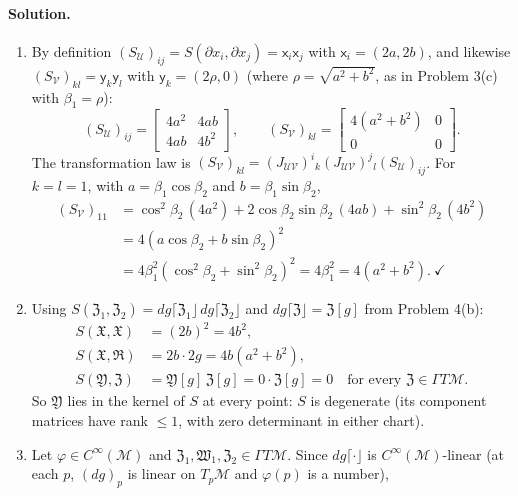 \documentclass[11pt]{article}
\newcommand{\Cinf}{C^\infty(\mathcal M)}
\begin{document}
\paragraph{Solution.}
\begin{enumerate}[label=(\alph*)]
\item By definition $(S_{\mathcal U})_{ij}=S(\partial x_i,\partial x_j)=\mathsf x_i\mathsf x_j$ with $\mathsf x_i=(2a,2b)$, and likewise $(S_{\mathcal V})_{kl}=\mathsf y_k\mathsf y_l$ with $\mathsf y_k=(2\rho,0)$
(where $\rho=\sqrt{a^2+b^2}$, as in Problem 3(c) with $\beta_1=\rho$):
\[
(S_{\mathcal U})_{ij}=\begin{bmatrix}4a^2&4ab\\4ab&4b^2\end{bmatrix},\qquad
(S_{\mathcal V})_{kl}=\begin{bmatrix}4(a^2+b^2)&0\\0&0\end{bmatrix}.
\]
The transformation law is $(S_{\mathcal V})_{kl}=(J_{\mathcal{UV}})^i{}_k(J_{\mathcal{UV}})^j{}_l(S_{\mathcal U})_{ij}$. For $k=l=1$, with $a=\beta_1\cos\beta_2$ and $b=\beta_1\sin\beta_2$,
\begin{align*}
(S_{\mathcal V})_{11}&=\cos^2\beta_2\,(4a^2)+2\cos\beta_2\sin\beta_2\,(4ab)+\sin^2\beta_2\,(4b^2)\\
&=4(a\cos\beta_2+b\sin\beta_2)^2\\
&=4\beta_1^2(\cos^2\beta_2+\sin^2\beta_2)^2=4\beta_1^2=4(a^2+b^2).\ \checkmark
\end{align*}
\item Using $S(\mathfrak Z_1,\mathfrak Z_2)=dg\lceil\mathfrak Z_1\rfloor\,dg\lceil\mathfrak Z_2\rfloor$ and $dg\lceil\mathfrak Z\rfloor=\mathfrak Z[g]$ from Problem 4(b):
\begin{align*}
S(\mathfrak X,\mathfrak X)&=(2b)^2=4b^2,\\
S(\mathfrak X,\mathfrak R)&=2b\cdot2g=4b(a^2+b^2),\\
S(\mathfrak Y,\mathfrak Z)&=\mathfrak Y[g]\,\mathfrak Z[g]=0\cdot\mathfrak Z[g]=0\quad\text{for every }\mathfrak Z\in\Gamma T\mathcal M.
\end{align*}
So $\mathfrak Y$ lies in the kernel of $S$ at every point: $S$ is degenerate (its component matrices have rank $\le1$, with zero determinant in either chart).
\item Let $\varphi\in\Cinf$ and $\mathfrak Z_1,\mathfrak W_1,\mathfrak Z_2\in\Gamma T\mathcal M$. Since $dg\lceil\cdot\rfloor$ is $C^\infty(\mathcal M)$-linear (at each $p$, $(dg)_p$ is linear on $T_p\mathcal M$ and $\varphi(p)$ is a number),

\end{enumerate}
\end{document}
